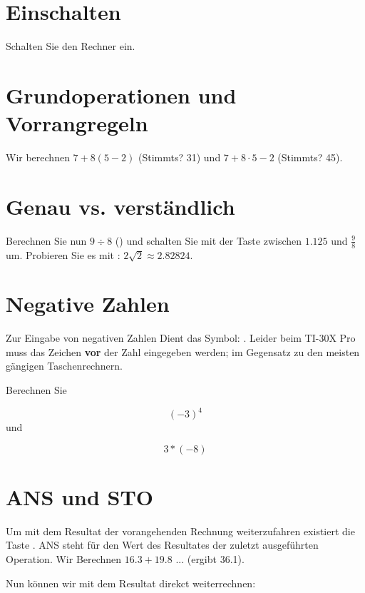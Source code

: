 

\renewcommand{\metaHeaderLine}{Arbeitsblatt}
\renewcommand{\arbeitsblattTitel}{Taschenrechner TI-30 Pro MathPrint
--- Einführung}

\arbeitsblattHeader{}

\section{Einschalten}
Schalten Sie den Rechner ein. 


\section{Grundoperationen und Vorrangregeln}
Wir berechnen $7 + 8(5-2)$  (Stimmts? 31) und $7 + 8\cdot 5 - 2$ (Stimmts? 45).

\section{Genau vs. verständlich}
Berechnen Sie nun $9 \div 8$ () und schalten Sie mit der
Taste  zwischen $1.125$ und $\frac{9}{8}$ um.
Probieren Sie es mit    :
$2\sqrt{2} \approx 2.82824$. 

\section{Negative Zahlen}
Zur Eingabe von negativen Zahlen Dient das
Symbol: . Leider beim TI-30X Pro muss das
Zeichen \textbf{vor} der Zahl eingegeben werden; im Gegensatz zu den
meisten gängigen Taschenrechnern.

Berechnen Sie

$$(-3)^4$$
und

$$3* (-8)$$
\newpage


\section{ANS und STO}
Um mit dem Resultat der vorangehenden Rechnung weiterzufahren
existiert die Taste  . ANS steht für den Wert des
Resultates der zuletzt ausgeführten Operation. Wir Berechnen $16.3 +
19.8$ ... (ergibt 36.1).

Nun können wir mit dem Resultat direkct weiterrechnen: 




